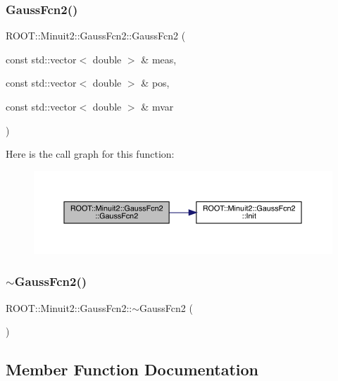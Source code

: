 \subsubsection{\texorpdfstring{GaussFcn2()}{GaussFcn2()}}
{\footnotesize\ttfamily R\+O\+O\+T\+::\+Minuit2\+::\+Gauss\+Fcn2\+::\+Gauss\+Fcn2 (\begin{DoxyParamCaption}\item[{const std\+::vector$<$ double $>$ \&}]{meas,  }\item[{const std\+::vector$<$ double $>$ \&}]{pos,  }\item[{const std\+::vector$<$ double $>$ \&}]{mvar }\end{DoxyParamCaption})\hspace{0.3cm}{\ttfamily [inline]}}

Here is the call graph for this function\+:\nopagebreak
\begin{figure}[H]
\begin{center}
\leavevmode
\includegraphics[width=350pt]{da/d5d/classROOT_1_1Minuit2_1_1GaussFcn2_a2904a79650d89e25591d84060e986271_cgraph}
\end{center}
\end{figure}
\mbox{\label{classROOT_1_1Minuit2_1_1GaussFcn2_ab37a15b9986eab678018570c2a744799}} 
\subsubsection{\texorpdfstring{$\sim$GaussFcn2()}{~GaussFcn2()}}
{\footnotesize\ttfamily R\+O\+O\+T\+::\+Minuit2\+::\+Gauss\+Fcn2\+::$\sim$\+Gauss\+Fcn2 (\begin{DoxyParamCaption}{ }\end{DoxyParamCaption})\hspace{0.3cm}{\ttfamily [inline]}}



\subsection{Member Function Documentation}
\mbox{\label{classROOT_1_1Minuit2_1_1GaussFcn2_ac240f7b6ecbb7bf842d786e3914c620a}} 
